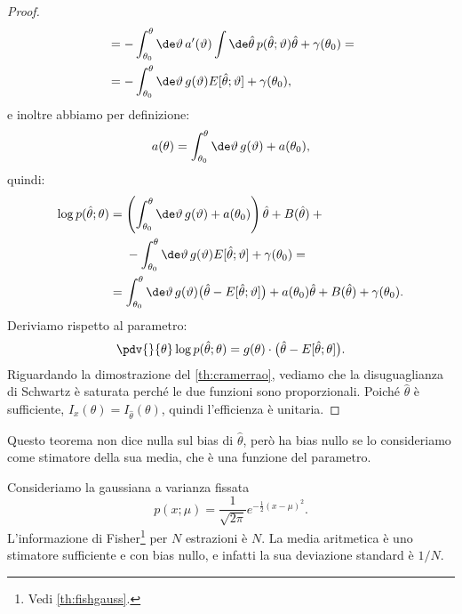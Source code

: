\begin{proof}
\begin{align*}
		&= - \int_{\theta_0}^\theta \de\vartheta\, a'(\vartheta)
		\int\de\hat\theta\, p(\hat\theta;\vartheta) \hat\theta
		+ \gamma(\theta_0) = \\
		&= - \int_{\theta_0}^\theta \de\vartheta\, g(\vartheta) E[\hat\theta;\vartheta]
		+ \gamma(\theta_0),
	\end{align*}
	e inoltre abbiamo per definizione:
	\begin{equation*}
		a(\theta)
		= \int_{\theta_0}^\theta \de\vartheta\, g(\vartheta) + a(\theta_0),
	\end{equation*}
	quindi:
	\begin{align*}
		\log p(\hat\theta;\theta)
		&= \left( \int_{\theta_0}^\theta \de\vartheta\, g(\vartheta) + a(\theta_0) \right) \hat\theta
		+ B(\hat\theta) + {}\\
		&\phantom{{}={}}- \int_{\theta_0}^\theta \de\vartheta\, g(\vartheta) E[\hat\theta;\vartheta] + \gamma(\theta_0) = \\
		&= \int_{\theta_0}^\theta \de\vartheta\, g(\vartheta) \big(\hat\theta-E[\hat\theta;\vartheta]\big)
		+ a(\theta_0)\hat\theta + B(\hat\theta) + \gamma(\theta_0).
	\end{align*}
	Deriviamo rispetto al parametro:
	\begin{equation*}
		\pdv{}{\theta} \log p(\hat\theta;\theta)
		= g(\theta) \cdot \big(\hat\theta-E[\hat\theta;\theta]\big).
	\end{equation*}
	Riguardando la dimostrazione del \autoref{th:cramerrao},
	vediamo che la disuguaglianza di Schwartz è saturata perché le due funzioni sono proporzionali.
	Poiché $\hat\theta$ è sufficiente, $I_x(\theta)=I_{\hat\theta}(\theta)$,
	quindi l'efficienza è unitaria.
\end{proof}

Questo teorema non dice nulla sul bias di $\hat\theta$,
però ha bias nullo se lo consideriamo come stimatore della sua media,
che è una funzione del parametro.

\begin{example}
	Consideriamo la gaussiana a varianza fissata
	\begin{equation*}
		p(x;\mu)
		= \frac1{\sqrt{2\pi}} e^{-\frac12 (x-\mu)^2}.
	\end{equation*}
	L'informazione di Fisher\footnote{Vedi \autoref{th:fishgauss}.} per $N$ estrazioni è $N$.
	La media aritmetica è uno stimatore sufficiente e con bias nullo,
	e infatti la sua deviazione standard è $1/N$.
\end{example}

